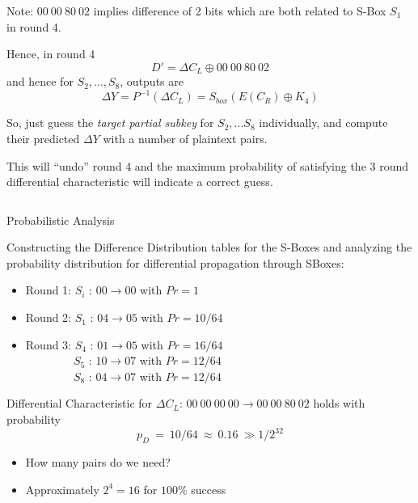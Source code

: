\documentclass[9pt]{beamer}
\begin{document}
\begin{frame}
\begin{columns}
\begin{column}{0.6\textwidth}
\vspace{2mm}
\pause Note: $00\:00\:80\:02$ implies difference of 2 bits which are both related to S-Box $S_1$ in round 4.

\vspace{2mm}
\pause Hence, in round 4
\[ D' = \Delta C_L \oplus 00\:00\:80\:02 \]
\pause and hence for $S_2, ... , S_8$, outputs are
\[ \Delta Y = P^{-1}(\Delta C_L) = S_{box}(E(C_R) \oplus K_4) \]

\vspace{2mm}
So, just guess the {\it target partial subkey} for $S_2, ... S_8$ individually, \pause and compute their predicted $\Delta Y$ with a number of plaintext pairs. 

\vspace{2mm}
\pause This will ``undo'' round 4 and  the maximum probability of satisfying the 3 round differential characteristic will indicate a correct guess.
\end{column}
\end{columns}
\end{frame}


\begin{frame}
Probabilistic Analysis

\vspace{5mm}
Constructing the Difference Distribution tables for the S-Boxes and analyzing the probability distribution for differential propagation through SBoxes:

\vspace{2mm}
\pause
\begin{itemize}[<+->]
\item{Round 1: $S_i$ : $00 \rightarrow 00$ with $Pr = 1$}
\item{Round 2: $S_1$ : $04 \rightarrow 05$ with $Pr = 10/64$}
\item{Round 3: $S_4$ : $01 \rightarrow 05$  with $Pr = 16/64$ \\ $\qquad \qquad \: S_5$ : $10 \rightarrow 07$ with $Pr = 12/64$ \\ $\qquad \qquad \: S_8$ : $04 \rightarrow 07$ with $Pr = 12/64$}
\end{itemize}

\vspace{3mm}
\pause Differential Characteristic for $\Delta C_L$: $00\:00\:00\:00 \rightarrow 00\:00\:80\:02$ holds with probability
\[ p_D \: = \: 10/64 \: \approx \: 0.16 \: \gg 1/2^{32} \]

\vspace{2mm}
\pause
\begin{itemize}[<+->]
\item{How many pairs do we need?}
\item{Approximately $2^4 = 16$ for $100\%$ success}
\end{itemize}

\end{frame}
\end{document}
